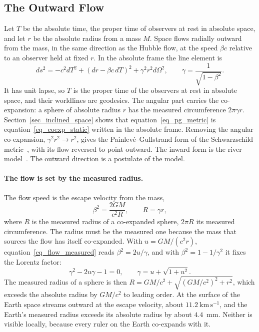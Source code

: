 \documentclass{iopjournal}
\begin{document}
\subsection{The Outward Flow}\label{sec_pg_relation}

Let $T$ be the absolute time, the proper time of observers at rest in absolute space, and let $r$ be the absolute radius from a mass $M$. Space flows radially outward from the mass, in the same direction as the Hubble flow, at the speed $\beta c$ relative to an observer held at fixed $r$. In the absolute frame the line element is
\begin{equation}\label{eq_pg_metric}
    ds^2=-c^2dT^2+\left(dr-\beta c\,dT\right)^2+\gamma^2r^2d\Omega^2,
    \qquad
    \gamma=\frac{1}{\sqrt{1-\beta^2}} .
\end{equation}
It has unit lapse, so $T$ is the proper time of the observers at rest in absolute space, and their worldlines are geodesics. The angular part carries the co-expansion: a sphere of absolute radius $r$ has the measured circumference $2\pi\gamma r$. Section~\ref{sec_inclined_space} shows that equation~\eqref{eq_pg_metric} is equation~\eqref{eq_coexp_static} written in the absolute frame. Removing the angular co-expansion, $\gamma^2r^2\to r^2$, gives the Painlev\'e--Gullstrand form of the Schwarzschild metric~\cite{Painleve1921,Gullstrand1922,MartelPoisson2001}, with its flow reversed to point outward. The inward form is the river model~\cite{HamiltonLisle2008}. The outward direction is a postulate of the model.

\paragraph{The flow is set by the measured radius.} The flow speed is the escape velocity from the mass,
\begin{equation}\label{eq_flow_measured}
    \beta^2=\frac{2GM}{c^2R},
    \qquad
    R=\gamma r ,
\end{equation}
where $R$ is the measured radius of a co-expanded sphere, $2\pi R$ its measured circumference. The radius must be the measured one because the mass that sources the flow has itself co-expanded. With $u=GM/(c^2r)$, equation~\eqref{eq_flow_measured} reads $\beta^2=2u/\gamma$, and with $\beta^2=1-1/\gamma^2$ it fixes the Lorentz factor:
\begin{equation}\label{eq_gamma_selfconsistent}
    \gamma^2-2u\gamma-1=0,
    \qquad
    \gamma=u+\sqrt{1+u^2}.
\end{equation}
The measured radius of a sphere is then $R=GM/c^2+\sqrt{(GM/c^2)^2+r^2}$, which exceeds the absolute radius by $GM/c^2$ to leading order. At the surface of the Earth space streams outward at the escape velocity, about $11.2~\mathrm{km\,s^{-1}}$, and the Earth's measured radius exceeds its absolute radius by about $4.4$~mm. Neither is visible locally, because every ruler on the Earth co-expands with it.
\end{document}
